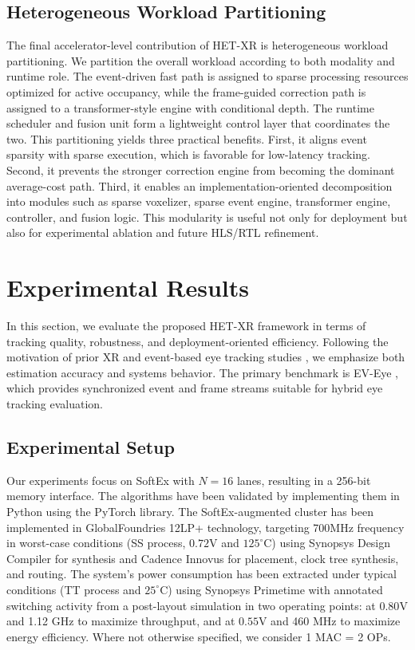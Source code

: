 \documentclass[journal]{IEEEtran}
\begin{document}
\subsection{Heterogeneous Workload Partitioning}
The final accelerator-level contribution of HET-XR is heterogeneous workload partitioning. We partition the overall workload according to both modality and runtime role. The event-driven fast path is assigned to sparse processing resources optimized for active occupancy, while the frame-guided correction path is assigned to a transformer-style engine with conditional depth. The runtime scheduler and fusion unit form a lightweight control layer that coordinates the two.
%
This partitioning yields three practical benefits. First, it aligns event sparsity with sparse execution, which is favorable for low-latency tracking. Second, it prevents the stronger correction engine from becoming the dominant average-cost path. Third, it enables an implementation-oriented decomposition into modules such as sparse voxelizer, sparse event engine, transformer engine, controller, and fusion logic. This modularity is useful not only for deployment but also for experimental ablation and future HLS/RTL refinement.
%
\section{Experimental Results}
\label{sec:experiental_results}
In this section, we evaluate the proposed HET-XR framework in terms of tracking quality, robustness, and deployment-oriented efficiency. Following the motivation of prior XR and event-based eye tracking studies \cite{plopski2022eye,kwon2023xrbench,zhao2023ev,chen2025ex}, we emphasize both estimation accuracy and systems behavior. The primary benchmark is EV-Eye \cite{zhao2023ev}, which provides synchronized event and frame streams suitable for hybrid eye tracking evaluation.
%
\subsection{Experimental Setup}
Our experiments focus on SoftEx with $N=16$ lanes, resulting in a 256-bit memory interface.
The algorithms have been validated by implementing them in Python using the PyTorch library. The SoftEx-augmented cluster has been implemented in GlobalFoundries 12LP+ technology, targeting 700MHz frequency in worst-case conditions (SS process, $0.72$V and $125^{\circ}$C) using Synopsys Design Compiler for synthesis and Cadence Innovus for placement, clock tree synthesis, and routing. The system's power consumption has been extracted under typical conditions (TT process and $25^{\circ}$C) using Synopsys Primetime with annotated switching activity from a post-layout simulation in two operating points: at $0.80$V and 1.12 GHz to maximize throughput, and at $0.55$V and 460 MHz to maximize energy efficiency. 
Where not otherwise specified, we consider 1 MAC = 2 OPs.
%
\end{document}
